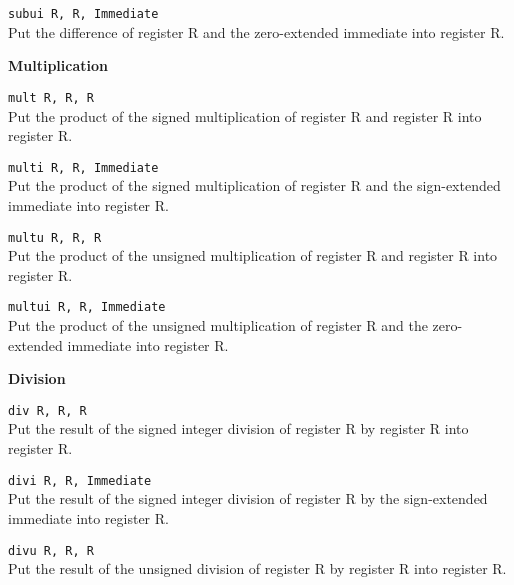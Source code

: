 \documentclass[12pt]{report}
\newcommand\subscr[1]{\raisebox{-0.5ex}{\small #1}}
\newcommand\regs{R\subscr{s}}
\newcommand\regd{R\subscr{d}}
\newcommand\regt{R\subscr{t}}
\begin{document}
\texttt{subui \regd, \regs, Immediate}\\
Put the difference of register \regs{} and the zero-extended immediate
into register \regd{}.
\vspace{1ex}

\noindent
{\bf Multiplication}

\texttt{mult \regd, \regs, \regt}\\
Put the product of the signed multiplication of register \regs{} and register \regt{}
into register \regd{}.
\vspace{1ex}

\texttt{multi \regd, \regs, Immediate}\\
Put the product of the signed multiplication of register \regs{} and the sign-extended immediate
into register \regd{}.
\vspace{1ex}

\texttt{multu \regd, \regs, \regt}\\
Put the product of the unsigned multiplication of register \regs{} and register \regt{}
into register \regd{}.
\vspace{1ex}

\texttt{multui \regd, \regs, Immediate}\\
Put the product of the unsigned multiplication of register \regs{} and the zero-extended immediate
into register \regd{}.
\vspace{1ex}

\noindent
{\bf Division}

\texttt{div \regd, \regs, \regt}\\
Put the result of the signed integer division of register \regs{} by register \regt{}
into register \regd{}.
\vspace{1ex}

\texttt{divi \regd, \regs, Immediate}\\
Put the result of the signed integer division of register \regs{} by the sign-extended immediate
into register \regd{}.
\vspace{1ex}

\newpage
\texttt{divu \regd, \regs, \regt}\\
Put the result of the unsigned division of register \regs{} by register \regt{}
into register \regd{}.
\vspace{1ex}
\end{document}
